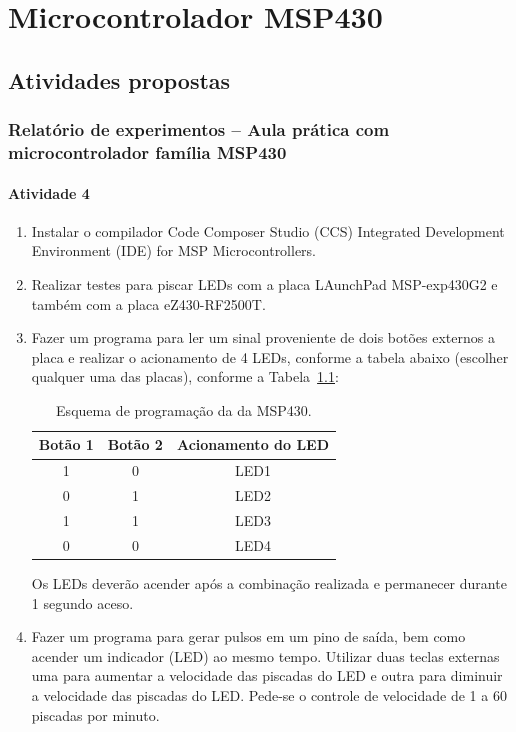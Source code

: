 \documentclass[
	12pt,				%
	openright,			%
  oneside,     %
	a4paper,			%
	english,			%
	french,				%
	spanish,			%
	brazil				%
	]{abntex2}
\begin{document}
\chapter{Microcontrolador MSP430}%
\label{cha:4-MSP430}

\section{Atividades propostas} %
\label{cha:MSP430-sec:atividades_propostas}

\subsection*{Relatório de experimentos – Aula prática com microcontrolador família MSP430}

\subsubsection*{Atividade 4}

\begin{enumerate}
  \item Instalar o compilador Code Composer Studio (CCS) Integrated Development Environment (IDE) for MSP Microcontrollers.
  \item Realizar testes para piscar LEDs com a placa LAunchPad MSP-exp430G2 e também com a placa eZ430-RF2500T.
  \item Fazer um programa para ler um sinal proveniente de dois botões externos a placa e realizar o acionamento de 4 LEDs, conforme a tabela abaixo (escolher qualquer uma das placas), conforme a Tabela~\ref{Table:MSP430}:
  \begin{table}[h]
    \centering
    \caption{\label{Table:MSP430}Esquema de programação da da MSP430.}
    \begin{tabular}{ccc}
    \hline
    {\textbf{Botão 1}} & {\textbf{Botão 2}} & {\textbf{Acionamento do LED}} \\ \hline
    1             & 0             & LED1                     \\
    0             & 1             & LED2                     \\
    1             & 1             & LED3                     \\
    0             & 0             & LED4                     \\ \hline
    \end{tabular}
  \end{table}

    Os LEDs deverão acender após a combinação realizada e permanecer durante 1 segundo aceso.

  \item Fazer um programa para gerar pulsos em um pino de saída, bem como acender um indicador (LED) ao mesmo tempo. Utilizar duas teclas externas uma para aumentar a velocidade das piscadas do LED e outra para diminuir a velocidade das piscadas do LED. Pede-se o controle de velocidade de 1 a 60 piscadas por minuto.
\end{enumerate}
\end{document}

